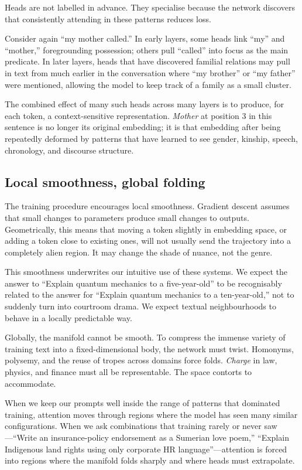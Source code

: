 \documentclass[12pt,a4paper]{article}
\begin{document}
Heads are not labelled in advance. They specialise because the network discovers that consistently attending in these patterns reduces loss.

Consider again ``my mother called.'' In early layers, some heads link ``my'' and ``mother,'' foregrounding possession; others pull ``called'' into focus as the main predicate. In later layers, heads that have discovered familial relations may pull in text from much earlier in the conversation where ``my brother'' or ``my father'' were mentioned, allowing the model to keep track of a family as a small cluster.

The combined effect of many such heads across many layers is to produce, for each token, a context-sensitive representation. \emph{Mother} at position 3 in this sentence is no longer its original embedding; it is that embedding after being repeatedly deformed by patterns that have learned to see gender, kinship, speech, chronology, and discourse structure.

\subsection*{Local smoothness, global folding}

The training procedure encourages local smoothness. Gradient descent assumes that small changes to parameters produce small changes to outputs. Geometrically, this means that moving a token slightly in embedding space, or adding a token close to existing ones, will not usually send the trajectory into a completely alien region. It may change the shade of nuance, not the genre.

This smoothness underwrites our intuitive use of these systems. We expect the answer to ``Explain quantum mechanics to a five-year-old'' to be recognisably related to the answer for ``Explain quantum mechanics to a ten-year-old,'' not to suddenly turn into courtroom drama. We expect textual neighbourhoods to behave in a locally predictable way.

Globally, the manifold cannot be smooth. To compress the immense variety of training text into a fixed-dimensional body, the network must twist. Homonyms, polysemy, and the reuse of tropes across domains force folds. \emph{Charge} in law, physics, and finance must all be representable. The space contorts to accommodate.

When we keep our prompts well inside the range of patterns that dominated training, attention moves through regions where the model has seen many similar configurations. When we ask combinations that training rarely or never saw---``Write an insurance-policy endorsement as a Sumerian love poem,'' ``Explain Indigenous land rights using only corporate HR language''---attention is forced into regions where the manifold folds sharply and where heads must extrapolate.
\end{document}
